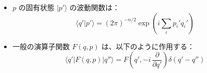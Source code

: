 \documentclass[a4paper,12pt]{article}
\begin{document}
\begin{itemize}
    \item $p$ の固有状態 $|p'\rangle$ の波動関数は：
      \begin{equation*}
      \langle q'|p'\rangle = (2\pi)^{-n/2} \exp\left(i \sum_i p_i' q_i'\right)
      \end{equation*}
    
    \item 一般の演算子関数 $F(q, p)$ は、以下のように作用する：
      \begin{equation*}
      \langle q'|F(q, p)|q''\rangle = F\left(q', -i\, \frac{\partial}{\partial q'}\right) \delta(q' - q'') \tag{1.5}
      \end{equation*}

    
    \end{itemize}
    
\end{document}
